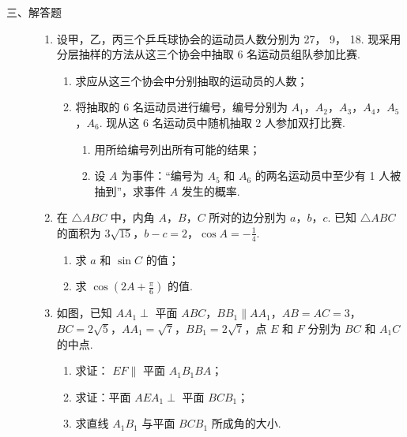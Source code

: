 \begin{description}

    \item[三、解答题]

    \begin{enumerate}[leftmargin=5pt]

      \addtocounter{enumi}{+14}

        \item 设甲，乙，丙三个乒乓球协会的运动员人数分别为 27， 9， 18. 现采用分层抽样的方法从这三个协会中抽取 6 名运动员组队参加比赛.
\begin{enumerate}
\item 求应从这三个协会中分别抽取的运动员的人数；
\item 将抽取的 6 名运动员进行编号，编号分别为 \(A_{1}\)，\(A_{2}\)，\(A_{3}\)，\(A_{4}\)，\(A_{5}\)，\(A_{6}\). 现从这 6 名运动员中随机抽取 2 人参加双打比赛.
\begin{enumerate}
\item 用所给编号列出所有可能的结果；
\item 设 \(A\) 为事件：“编号为 \(A_{5}\) 和 \(A_{6}\) 的两名运动员中至少有 1 人被抽到”，求事件 \(A\) 发生的概率.
\end{enumerate}
\end{enumerate}

        \item 在 \(\triangle ABC\) 中，内角 \(A\)，\(B\)，\(C\) 所对的边分别为 \(a\)，\(b\)，\(c\). 已知 \(\triangle ABC\) 的面积为 \(3\sqrt{15}\)，\(b - c = 2\)，\(\cos A = -\frac{1}{4}\).
\begin{enumerate}
\item 求 \(a\) 和 \( \sin C \) 的值；
\item 求 \( \cos\left(2A+\frac{\pi}{6}\right) \) 的值.
\end{enumerate}

        \item 如图，已知 \(AA_{1} \perp\) 平面 \(ABC\)，\(BB_{1} \parallel AA_{1}\)，\(AB = AC = 3\)，\(BC = 2\sqrt{5}\)，\(AA_{1} = \sqrt{7}\)，\(BB_{1} = 2\sqrt{7}\)，点 \(E\) 和 \(F\) 分别为 \(BC\) 和 \(A_{1}C\) 的中点.

\begin{enumerate}
\item 求证： \(EF \parallel\) 平面 \(A_{1}B_{1}BA\)；
\item 求证：平面 \( AEA_{1} \perp \) 平面 \(BCB_{1}\)；
\item 求直线 \(A_{1}B_{1}\) 与平面 \(BCB_{1}\) 所成角的大小.
\end{enumerate}


\end{enumerate}
\end{description}

